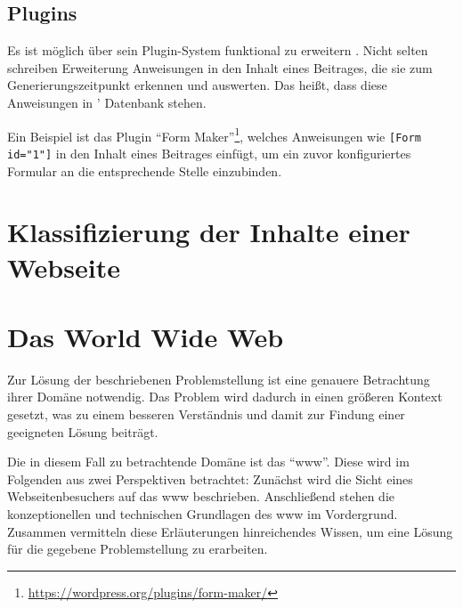         \subsection{Plugins}
            \label{section:wordpressPlugins}
            Es ist möglich {\wordpress} über sein Plugin-System funktional
            zu erweitern \cite{wordpress:Plugins}.
            Nicht selten schreiben Erweiterung Anweisungen in den Inhalt
            eines Beitrages, die sie zum Generierungszeitpunkt erkennen und auswerten.
            Das heißt, dass diese Anweisungen in {\wordpress'} Datenbank stehen.

            Ein Beispiel ist das Plugin
            "`Form Maker"'\footnote{\url{https://wordpress.org/plugins/form-maker/}},
            welches Anweisungen wie \texttt{[Form id="1"]} in den Inhalt eines Beitrages
            einfügt, um ein zuvor konfiguriertes Formular an die entsprechende Stelle einzubinden.


    \section{Klassifizierung der Inhalte einer Webseite}

    
    \section{Das World Wide Web}
        \label{section:TheWWW}
        Zur Lösung der beschriebenen Problemstellung ist eine genauere
        Betrachtung ihrer Domäne notwendig.
        Das Problem wird dadurch in einen größeren Kontext gesetzt,
        was zu einem besseren Verständnis und damit zur Findung
        einer geeigneten Lösung beiträgt.

        Die in diesem Fall zu betrachtende Domäne ist das "`\gls{www}"'.
        Diese wird im Folgenden aus zwei Perspektiven betrachtet:
        Zunächst wird die Sicht eines Webseitenbesuchers auf das \gls{www} beschrieben.
        Anschließend stehen die konzeptionellen und technischen Grundlagen
        des \gls{www} im Vordergrund.
        Zusammen vermitteln diese Erläuterungen hinreichendes Wissen,
        um eine Lösung für die gegebene Problemstellung zu erarbeiten.

